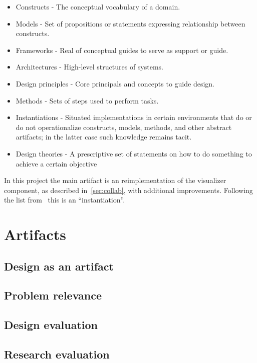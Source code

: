 \documentclass[../Main/thesis.tex]{subfiles}
\begin{document}
\begin{itemize}
    \item Constructs - The conceptual vocabulary of a domain.
    \item Models - Set of propositions or statements expressing relationship
        between constructs.
    \item Frameworks - Real of conceptual guides to serve as support or guide.
    \item Architectures - High-level structures of systems.
    \item Design principles - Core principals and concepts to guide design.
    \item Methods - Sets of steps used to perform tasks.
    \item Instantiations - Situated implementations in certain environments that do or do not
operationalize constructs, models, methods, and other abstract artifacts; in the
latter case such knowledge remains tacit.
    \item Design theories -  A prescriptive set of statements on how to do something to achieve a certain objective
\end{itemize}

In this project the main artifact is an reimplementation of the visualizer
component, as described in~\ref{sec:collab}, with additional improvements.
Following the list from~\citeauthor{Vaishnavi:2015:DSR:2807332} this is an
``instantiation''.

\section{Artifacts}%
\label{sec:artifacts}

\subsection*{Design as an artifact}%
\label{sub:design_as_an_artifact}

\subsection*{Problem relevance}%
\label{sub:problem_relevance}

\subsection*{Design evaluation}%
\label{sub:design_evaluation}

\subsection*{Research evaluation}%
\label{sub:research_evaluation}
\end{document}
